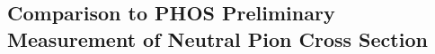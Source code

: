 \subsection{Comparison to PHOS Preliminary Measurement of Neutral Pion Cross Section}
% 
% 
% 
% 		
% 
% 		
